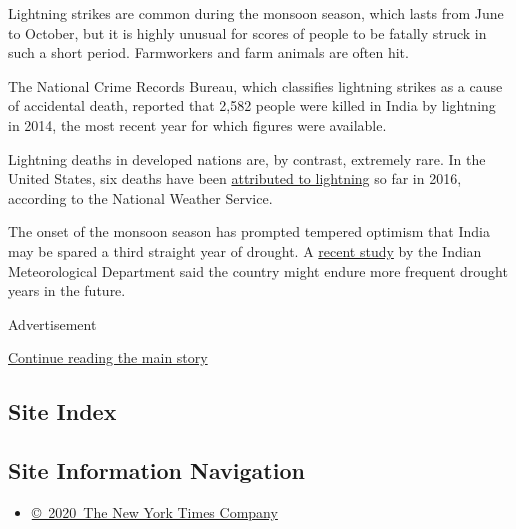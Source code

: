 Lightning strikes are common during the monsoon season, which lasts from
June to October, but it is highly unusual for scores of people to be
fatally struck in such a short period. Farmworkers and farm animals are
often hit.

The National Crime Records Bureau, which classifies lightning strikes as
a cause of accidental death, reported that 2,582 people were killed in
India by lightning in 2014, the most recent year for which figures were
available.

Lightning deaths in developed nations are, by contrast, extremely rare.
In the United States, six deaths have been
\href{http://www.lightningsafety.noaa.gov/fatalities.shtml}{attributed
to lightning} so far in 2016, according to the National Weather Service.

The onset of the monsoon season has prompted tempered optimism that
India may be spared a third straight year of drought. A
\href{http://indianexpress.com/article/india/india-news-india/maharashtra-gujarat-drought-waterless-monsoon-crisis-years-may-become-more-frequent-in-india-says-study-2826500/}{recent
study} by the Indian Meteorological Department said the country might
endure more frequent drought years in the future.

Advertisement

\protect\hyperlink{after-bottom}{Continue reading the main story}

\hypertarget{site-index}{%
\subsection{Site Index}\label{site-index}}

\hypertarget{site-information-navigation}{%
\subsection{Site Information
Navigation}\label{site-information-navigation}}

\begin{itemize}
\tightlist
\item
  \href{https://help.nytimes.com/hc/en-us/articles/115014792127-Copyright-notice}{©~2020~The
  New York Times Company}
\end{itemize}

